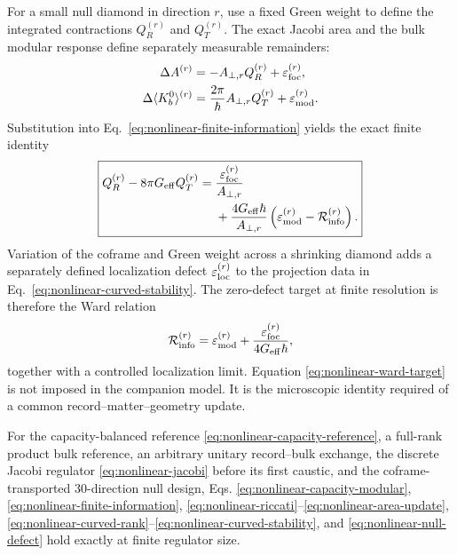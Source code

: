 For a small null diamond in direction \(r\), use a fixed Green weight to
define the integrated contractions \(Q_R^{(r)}\) and \(Q_T^{(r)}\).  The
exact Jacobi area and the bulk modular response define separately measurable
remainders:
\begin{align}
 \Delta A^{(r)}
 &=-A_{\perp,r}Q_R^{(r)}+\varepsilon_{\rm foc}^{(r)},\label{eq:nonlinear-foc-def}\\
 \Delta\langle K_b^0\rangle^{(r)}
 &=\frac{2\pi}{\hbar}A_{\perp,r}Q_T^{(r)}
 +\varepsilon_{\rm mod}^{(r)}.\label{eq:nonlinear-mod-def}
\end{align}
Substitution into Eq.~\eqref{eq:nonlinear-finite-information} yields the exact
finite identity
\begin{equation}
 \boxed{\begin{aligned}
 Q_R^{(r)}-8\pi G_{\rm eff}Q_T^{(r)}
 ={}&\frac{\varepsilon_{\rm foc}^{(r)}}{A_{\perp,r}}\\
 &+\frac{4G_{\rm eff}\hbar}{A_{\perp,r}}
 \left(\varepsilon_{\rm mod}^{(r)}
 -\mathcal R_{\rm info}^{(r)}\right).
 \end{aligned}}
 \label{eq:nonlinear-null-defect}
\end{equation}
Variation of the coframe and Green weight across a shrinking diamond adds a
separately defined localization defect
\(\varepsilon_{\rm loc}^{(r)}\) to the projection data in
Eq.~\eqref{eq:nonlinear-curved-stability}.  The zero-defect target at finite
resolution is therefore the Ward relation
\begin{equation}
 \mathcal R_{\rm info}^{(r)}
 =\varepsilon_{\rm mod}^{(r)}
 +\frac{\varepsilon_{\rm foc}^{(r)}}
 {4G_{\rm eff}\hbar},
 \label{eq:nonlinear-ward-target}
\end{equation}
together with a controlled localization limit.  Equation
\eqref{eq:nonlinear-ward-target} is not imposed in the companion model.  It
is the microscopic identity required of a common
record--matter--geometry update.

\begin{theorem}
\label{thm:finite-nonlinear-remainder}
For the capacity-balanced reference
\eqref{eq:nonlinear-capacity-reference}, a full-rank product bulk reference,
an arbitrary unitary record--bulk exchange, the discrete Jacobi regulator
\eqref{eq:nonlinear-jacobi} before its first caustic, and the coframe-
transported 30-direction null design, Eqs.
\eqref{eq:nonlinear-capacity-modular},
\eqref{eq:nonlinear-finite-information},
\eqref{eq:nonlinear-riccati}--\eqref{eq:nonlinear-area-update},
\eqref{eq:nonlinear-curved-rank}--\eqref{eq:nonlinear-curved-stability}, and
\eqref{eq:nonlinear-null-defect} hold exactly at finite regulator size.
\end{theorem}

